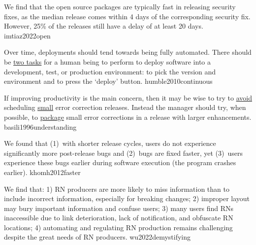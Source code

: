 \documentclass{article}
\begin{document}
  {We find that the open source packages are typically fast in releasing security fixes, as the median release comes within 4 days of the corresponding security fix. However, 25\% of the releases still have a delay of at least 20 days.}
  {imtiaz2022open}


  {Over time, deployments should tend towards being fully automated. There should be \ul{two tasks} for a human being to perform to deploy software into a development, test, or production environment: to pick the version and environment and to press the `deploy' button.}
  {humble2010continuous}


  {If improving productivity is the main concern, then it may be wise to try to \ul{avoid} scheduling \ul{small} error correction releases. Instead the manager should try, when possible, to \ul{package} small error corrections in a release with larger enhancements.
  }
  {basili1996understanding}

  {We found that (1)~with shorter release cycles, users do not experience significantly more post-release bugs and (2)~bugs are fixed faster, yet (3)~users experience these bugs earlier during software execution (the program crashes earlier).}
  {khomh2012faster}






  {We find that: 1) RN producers are more likely to miss information than to include incorrect information, especially for breaking changes; 2) improper layout may bury important information and confuse users; 3) many users find RNs inaccessible due to link deterioration, lack of notification, and obfuscate RN locations; 4) automating and regulating RN production remains challenging despite the great needs of RN producers.}
  {wu2022demystifying}
\end{document}
